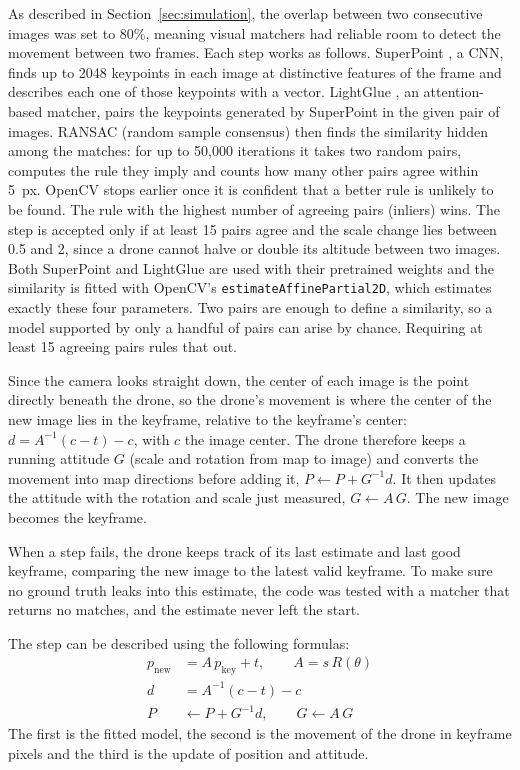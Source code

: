 \documentclass[english, Lau, oneside]{sapthesis}%
\begin{document}
As described in Section~\ref{sec:simulation}, the overlap between two consecutive images was set to 80\%, meaning visual matchers had reliable room to detect the movement between two frames. Each step works as follows. SuperPoint \citep{detone2018superpoint}, a CNN, finds up to 2048 keypoints in each image at distinctive features of the frame and describes each one of those keypoints with a vector. LightGlue \citep{lindenberger2023lightglue}, an attention-based matcher, pairs the keypoints generated by SuperPoint in the given pair of images. RANSAC (random sample consensus) \citep{fischler1981ransac} then finds the similarity hidden among the matches: for up to 50{,}000 iterations it takes two random pairs, computes the rule they imply and counts how many other pairs agree within 5~px. OpenCV \citep{bradski2000opencv} stops earlier once it is confident that a better rule is unlikely to be found. The rule with the highest number of agreeing pairs (inliers) wins. The step is accepted only if at least 15 pairs agree and the scale change lies between 0.5 and 2, since a drone cannot halve or double its altitude between two images. Both SuperPoint and LightGlue are used with their pretrained weights and the similarity is fitted with OpenCV's \texttt{estimateAffinePartial2D}, which estimates exactly these four parameters. Two pairs are enough to define a similarity, so a model supported by only a handful of pairs can arise by chance. Requiring at least 15 agreeing pairs rules that out.

Since the camera looks straight down, the center of each image is the point directly beneath the drone, so the drone's movement is where the center of the new image lies in the keyframe, relative to the keyframe's center: $d = A^{-1}(c - t) - c$, with $c$ the image center. The drone therefore keeps a running attitude $G$ (scale and rotation from map to image) and converts the movement into map directions before adding it, $P \leftarrow P + G^{-1} d$. It then updates the attitude with the rotation and scale just measured, $G \leftarrow A\,G$. The new image becomes the keyframe.

When a step fails, the drone keeps track of its last estimate and last good keyframe, comparing the new image to the latest valid keyframe. To make sure no ground truth leaks into this estimate, the code was tested with a matcher that returns no matches, and the estimate never left the start.

The step can be described using the following formulas:
\begin{align}
  p_{\mathrm{new}} &= A\,p_{\mathrm{key}} + t, \qquad A = s\,R(\theta) \label{eq:vo-model}\\
  d &= A^{-1}(c - t) - c \label{eq:vo-move}\\
  P &\leftarrow P + G^{-1} d, \qquad G \leftarrow A\,G \label{eq:vo-update}
\end{align}
The first is the fitted model, the second is the movement of the drone in keyframe pixels and the third is the update of position and attitude.
\end{document}

